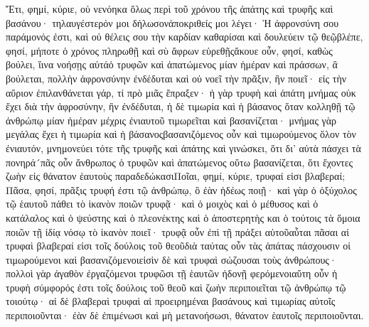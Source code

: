 Ἔτι, φημί, κύριε, οὐ νενόηκα ὅλως περὶ τοῦ χρόνου τῆς ἀπάτης καὶ τρυφῆς καὶ βασάνου· τηλαυγέστερόν μοι δήλωσονἀποκριθείς μοι λέγει· Ἡ ἀφρονσύνη σου παράμονός ἐστι, καὶ οὐ θέλεις σου τὴν καρδίαν καθαρίσαι καὶ δουλεύειν τῷ θεῷβλέπε, φησί, μήποτε ὁ χρόνος πληρωθῇ καὶ σὺ ἄφρων εὑρεθῇςἄκουε οὖν, φησί, καθὼς βούλει, ἵινα νοήσῃς αὐτάὁ τρυφῶν καὶ ἀπατώμενος μίαν ἡμέραν καὶ πράσσων, ἃ βούλεται, πολλὴν ἀφρονσύνην ἐνδέδυται καὶ οὐ νοεῖ τὴν πρᾶξιν, ἣν ποιεῖ· εἰς τὴν αὔριον ἐπιλανθάνεται γάρ, τί πρὸ μιᾶς ἔπραξεν· ἡ γὰρ τρυφὴ καὶ ἀπάτη μνήμας οὐκ ἔχει διὰ τὴν ἀφροσύνην, ἣν ἐνδέδυται, ἡ δὲ τιμωρία καὶ ἡ βάσανος ὅταν κολληθῇ τῷ ἀνθρώπῳ μίαν ἡμέραν μέχρις ἐνιαυτοῦ τιμωρεῖται καὶ βασανίζεται· μνήμας γὰρ μεγάλας ἔχει ἡ τιμωρία καὶ ἡ βάσανοςβασανιζόμενος οὖν καὶ τιμωρούμενος ὅλον τὸν ἐνιαυτόν, μνημονεύει τότε τῆς τρυφῆς καὶ ἀπάτης καὶ γινώσκει, ὅτι δι’ αὐτὰ πάσχει τὰ πονηρά´πᾶς οὖν ἄνθρωπος ὁ τρυφῶν καὶ ἀπατώμενος οὕτω βασανίζεται, ὅτι ἔχοντες ζωὴν εἰς θάνατον ἑαυτοὺς παραδεδώκασιΠοῖαι, φημί, κύριε, τρυφαί εἰσι βλαβεραί; Πᾶσα, φησί, πρᾶξις τρυφή ἐστι τῷ ἀνθρώπῳ, ὃ ἐὰν ἡδέως ποιῇ· καὶ γὰρ ὁ ὀξύχολος τῷ ἑαυτοῦ πάθει τὸ ἱκανὸν ποιῶν τρυφᾷ· καὶ ὁ μοιχὸς καὶ ὁ μέθυσος καὶ ὁ κατάλαλος καὶ ὁ ψεύστης καὶ ὁ πλεονέκτης καὶ ὁ ἀποστερητὴς και ὁ τούτοις τὰ ὅμοια ποιῶν τῇ ἰδίᾳ νόσῳ τὸ ἱκανὸν ποιεῖ· τρυφᾷ οὖν ἐπὶ τῇ πράξει αὐτοῦαὗται πᾶσαι αἱ τρυφαὶ βλαβεραί εἰσι τοῖς δούλοις τοῦ θεοῦδιὰ ταύτας οὖν τὰς ἀπάτας πάσχουσιν οἱ τιμωρούμενοι καὶ βασανιζόμενοιεἰσὶν δὲ καὶ τρυφαὶ σώζουσαι τοὺς ἀνθρώπους· πολλοὶ γὰρ ἀγαθὸν ἐργαζόμενοι τρυφῶσι τῇ ἑαυτῶν ἡδονῇ φερόμενοιαὕτη οὖν ἡ τρυφὴ σύμφορός ἐστι τοῖς δούλοις τοῦ θεοῦ καὶ ζωὴν περιποιεῖται τῷ ἀνθρώπῳ τῷ τοιούτῳ· αἱ δὲ βλαβεραὶ τρυφαὶ αἱ προειρημέναι βασάνους καὶ τιμωρίας αὐτοῖς περιποιοῦνται· ἐὰν δὲ ἐπιμένωσι καὶ μὴ μετανοήσωσι, θάνατον ἑαυτοῖς περιποιοῦνται.

